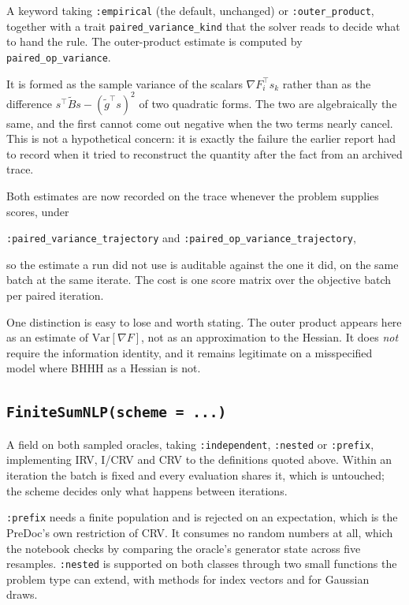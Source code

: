 \documentclass[11pt,a4paper]{article}
\begin{document}
A keyword taking \texttt{:empirical} (the default, unchanged) or
\texttt{:outer\_product}, together with a trait \texttt{paired\_variance\_kind} that
the solver reads to decide what to hand the rule. The outer-product estimate is
computed by \texttt{paired\_op\_variance}.

It is formed as the sample variance of the scalars $\nabla F_i^\top s_k$ rather than
as the difference $s^\top \tilde B s - (\tilde g^\top s)^2$ of two quadratic forms.
The two are algebraically the same, and the first cannot come out negative when the
two terms nearly cancel. This is not a hypothetical concern: it is exactly the
failure the earlier report had to record when it tried to reconstruct the quantity
after the fact from an archived trace.

Both estimates are now recorded on the trace whenever the problem supplies scores,
under

\begin{center}
\texttt{:paired\_variance\_trajectory} \qquad and \qquad
\texttt{:paired\_op\_variance\_trajectory},
\end{center}

so the estimate a run did not use is auditable against the one it did, on the same
batch at the same iterate. The cost is one score matrix over the objective batch per
paired iteration.

One distinction is easy to lose and worth stating. The outer product appears here as
an estimate of $\mathrm{Var}[\nabla F]$, not as an approximation to the Hessian. It
does \emph{not} require the information identity, and it remains legitimate on a
misspecified model where BHHH as a Hessian is not.

\subsection{\texorpdfstring{\texttt{FiniteSumNLP(scheme = ...)}}{FiniteSumNLP(scheme)}}

A field on both sampled oracles, taking \texttt{:independent}, \texttt{:nested} or
\texttt{:prefix}, implementing IRV, I/CRV and CRV to the definitions quoted above.
Within an iteration the batch is fixed and every evaluation shares it, which is
untouched; the scheme decides only what happens between iterations.

\texttt{:prefix} needs a finite population and is rejected on an expectation, which
is the PreDoc's own restriction of CRV. It consumes no random numbers at all, which
the notebook checks by comparing the oracle's generator state across five
resamples. \texttt{:nested} is supported on both classes through two small
functions the problem type can extend, with methods for index vectors and for
Gaussian draws.
\end{document}
